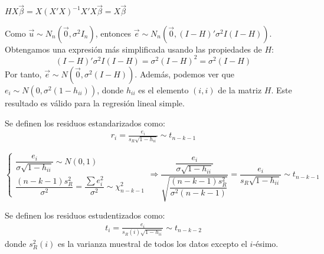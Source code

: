 \begin{obs}
    $HX\vec{\beta} = X(X'X)^{-1}X'X\vec{\beta} = X\vec{\beta}$
\end{obs}

Como $\vec{u} \sim N_n(\vec{0}, \sigma^2I_n)$, entonces $\vec{e} \sim N_n(\vec{0}, (I-H)'\sigma^2I(I-H))$.
Obtengamos una expresión más simplificada usando las propiedades de $H$:
$$(I-H)'\sigma^2I(I-H) = \sigma^2(I-H)^2 = \sigma^2(I-H)$$
Por tanto, $\vec{e} \sim N(\vec{0}, \sigma^2(I-H))$.
Además, podemos ver que $e_i \sim N(0, \sigma^2(1-h_{ii}))$, donde $h_{ii}$ es el elemento $(i,i)$ de la matriz $H$.
Este resultado es válido para la regresión lineal simple.

Se definen los residuos estandarizados como:
\begin{align*}
    \boxed{
    r_i = \frac{e_i}{s_R\sqrt{1-h_{ii}}} \sim t_{n-k-1}
    }
\end{align*}

\begin{obs}
    $$\begin{cases}
            \dfrac{e_i}{\sigma\sqrt{1-h_{ii}}} \sim N(0, 1) \\
            \dfrac{(n-k-1)s_R^2}{\sigma^2} = \dfrac{\sum e_i^2}{\sigma^2} \sim \chi^2_{n-k-1}
        \end{cases} \Rightarrow
        \frac{\dfrac{e_i}{\sigma\sqrt{1-h_{ii}}}}{\sqrt{\dfrac{(n-k-1)s_R^2}{\sigma^2(n-k-1)}}} = \frac{e_i}{s_R\sqrt{1-h_{ii}}} \sim t_{n-k-1}$$
\end{obs}

Se definen los residuos estudentizados como:
\begin{align*}
    \boxed{
    t_i = \frac{e_i}{s_R(i)\sqrt{1-h_{ii}}} \sim t_{n-k-2}
    }
\end{align*}
donde $s_R^2(i)$ es la varianza muestral de todos los datos excepto el $i$-ésimo.

